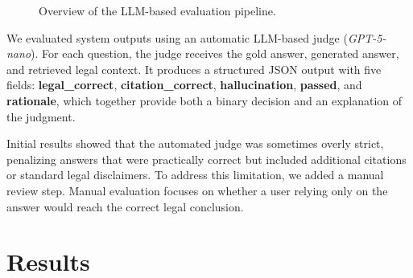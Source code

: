 \documentclass[fleqn,moreauthors,10pt]{ds_report}
\begin{document}
\begin{figure}[h]
  \centering
  \caption{Overview of the LLM-based evaluation pipeline.}
  \label{fig:evaluation_pipeline}
\end{figure}

We evaluated system outputs using an automatic LLM-based judge (\emph{GPT-5-nano}). For each question, the judge receives the gold answer, generated answer, and retrieved legal context. It produces a structured JSON output with five fields: \textbf{legal\_correct}, \textbf{citation\_correct}, \textbf{hallucination}, \textbf{passed}, and \textbf{rationale}, which together provide both a binary decision and an explanation of the judgment.

Initial results showed that the automated judge was sometimes overly strict, penalizing answers that were practically correct but included additional citations or standard legal disclaimers. To address this limitation, we added a manual review step. Manual evaluation focuses on whether a user relying only on the answer would reach the correct legal conclusion.



\newpage
\section*{Results}
\end{document}
